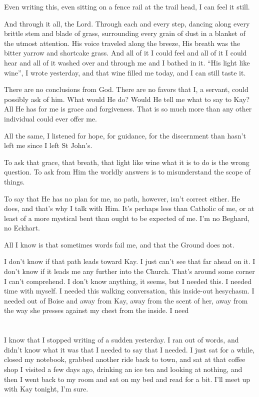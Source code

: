 Even writing this, even sitting on a fence rail at the trail head, I can feel it still.

And through it all, the Lord. Through each and every step, dancing along every brittle stem and blade of grass, surrounding every grain of dust in a blanket of the utmost attention. His voice traveled along the breeze, His breath was the bitter yarrow and shortcake grass. And all of it I could feel and all of it I could hear and all of it washed over and through me and I bathed in it. ``His light like wine'', I wrote yesterday, and that wine filled me today, and I can still taste it.

There are no conclusions from God. There are no favors that I, a servant, could possibly ask of him. What would He do? Would He tell me what to say to Kay? All He has for me is grace and forgiveness. That is so much more than any other individual could ever offer me.

All the same, I listened for hope, for guidance, for the discernment than hasn't left me since I left St John's.

To ask that grace, that breath, that light like wine what it is to do is the wrong question. To ask from Him the worldly answers is to misunderstand the scope of things.

To say that He has no plan for me, no path, however, isn't correct either. He does, and that's why I talk with Him. It's perhaps less than Catholic of me, or at least of a more mystical bent than ought to be expected of me. I'm no Beghard, no Eckhart.

All I know is that sometimes words fail me, and that the Ground does not.

I don't know if that path leads toward Kay. I just can't see that far ahead on it. I don't know if it leads me any further into the Church. That's around some corner I can't comprehend. I don't know anything, it seems, but I needed this. I needed time with myself. I needed this walking conversation, this inside-out hesychasm. I needed out of Boise and away from Kay, away from the scent of her, away from the way she presses against my chest from the inside. I need

\section{}

I know that I stopped writing of a sudden yesterday. I ran out of words, and didn't know what it was that I needed to say that I needed. I just sat for a while, closed my notebook, grabbed another ride back to town, and sat at that coffee shop I visited a few days ago, drinking an ice tea and looking at nothing, and then I went back to my room and sat on my bed and read for a bit. I'll meet up with Kay tonight, I'm sure.

